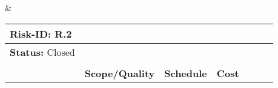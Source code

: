 \begin{table}[H]
\begin{tabular}

	 		&	 \\ 
		
		\hline

		
	\end{tabular}
	\caption{Risk 1 data sheet}
\end{table}

\begin{table}[H]
	\centering
	\begin{tabular}{| >{\raggedright\arraybackslash}p{1.8cm} | >{\raggedright\arraybackslash}p{2.4cm} | >{\raggedright\arraybackslash}p{1.6cm} | >{\raggedright\arraybackslash}p{1cm} | >{\raggedright\arraybackslash}p{1.3cm} | >{\raggedright\arraybackslash}p{1.9cm} | >{\raggedright\arraybackslash}p{2cm} |}
		
		\hline
		
		\textbf{Risk-ID:} \newline R.2	&	\multicolumn{6}{| >{\raggedright\arraybackslash}p{11.6cm} |}{\textbf{Risk Description:} \newline Inaccurate cost forecast: The financial predictions could be wrong or different issues may occur increasing the total cost of the project.}	\\ 
		
		\hline
		
		\textbf{Status:} \newline Closed	&	\multicolumn{6}{| >{\raggedright\arraybackslash}p{11.6cm} |}{\textbf{Risk Cause:} \newline The costs of the hardware are estimated; they may change a little until the day of purchase. When any task goes wrong, there might be some extra costs involved.}	\\ 
		
		\hline

		\multirow{2}{*}{\textbf{Probability}} 	&	\multicolumn{3}{| >{\raggedright\arraybackslash}p{4.5cm} |}{\textbf{Impact}}  &  \multirow{2}{*}{ \textbf{Score}}  &   \multicolumn{2}{| >{\raggedright\arraybackslash}p{4cm} |}{\multirow{2}{*}{\textbf{Responses}}}  \\ 
		
		\cline{2-4}

		\multirow{2}{*}{} &  \textbf{Scope/Quality}  &   \textbf{Schedule}  &   \textbf{Cost}  &    \multirow{2}{*}{}  &\multicolumn{2}{| >{\raggedright\arraybackslash}p{4cm} |}{\multirow{2}{*}{}}   \\  


\end{tabular}
\end{table}
